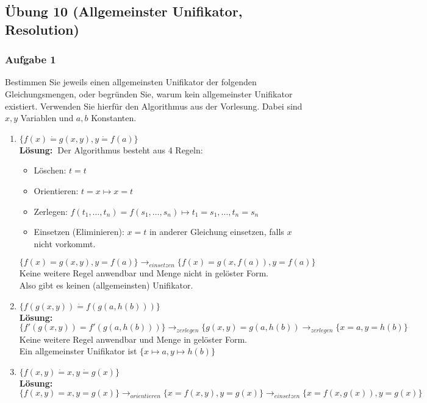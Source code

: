 \documentclass[a4paper,10pt]{article}
\newcommand{\f}[1]{\textbf{#1}}
\newcommand{\LOES}{\f{Lösung:~}}
\begin{document}
\subsection*{Übung 10 (Allgemeinster Unifikator, Resolution)}
\subsubsection*{Aufgabe 1}
Bestimmen Sie jeweils einen allgemeinsten Unifikator der folgenden Gleichungsmengen, oder begründen Sie, warum kein allgemeinster Unifikator existiert. Verwenden Sie hierfür den Algorithmus aus der Vorlesung. Dabei sind $x,y$ Variablen und $a,b$ Konstanten.
\begin{enumerate}
\item $\{ f(x) \dot{=} g(x,y), y \dot{=} f(a) \}$ \\
\LOES Der Algorithmus besteht aus 4 Regeln: 
\begin{itemize}
\item Löschen: $t=t$
\item Orientieren: $t=x \mapsto x=t$
\item Zerlegen: $f(t_1,\dots,t_n) = f(s_1,\dots,s_n) \mapsto t_1=s_1,\dots, t_n=s_n$
\item Einsetzen (Eliminieren): $x=t$ in anderer Gleichung einsetzen, falls $x$ nicht vorkommt.
\end{itemize}
\begin{equation*}
\{ f(x) = g(x,y), y = f(a) \} \rightarrow_{einsetzen} \{ f(x) = g(x,f(a)), y = f(a) \}
\end{equation*}
Keine weitere Regel anwendbar und Menge nicht in gelöster Form. \\
Also gibt es keinen (allgemeinsten) Unifikator.
\item $\{ f(g(x,y)) \dot{=} f(g(a,h(b))) \}$ \\
\LOES 
\begin{equation*}
\{ f'(g(x,y)) = f'(g(a,h(b))) \} \rightarrow_{zerlegen} \{g(x,y) = g(a,h(b)) \rightarrow_{zerlegen} \{x=a, y=h(b)\}
\end{equation*}
Keine weitere Regel anwendbar und Menge in gelöster Form. \\
Ein allgemeinster Unifikator ist $\{x \mapsto a, y \mapsto h(b) \}$
\item $\{ f(x,y) \dot{=} x, y \dot{=} g(x) \}$ \\
\LOES
\begin{equation*}
\{ f(x,y) = x, y = g(x) \} \rightarrow_{orientieren} \{x=f(x,y), y=g(x)\} \rightarrow_{einsetzen} \{x = f(x,g(x)), y= g(x) \}

\end{equation*}
\end{enumerate}
\end{document}

